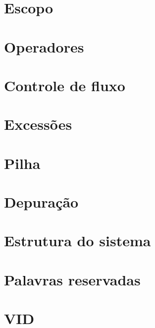 \documentclass[12pt]{article}
\begin{document}
\section{Escopo}
\section{Operadores}
\section{Controle de fluxo}
\section{Excessões}
\section{Pilha}
\section{Depuração}
\section{Estrutura do sistema}
\section{Palavras reservadas}
\section{VID}
\end{document}
